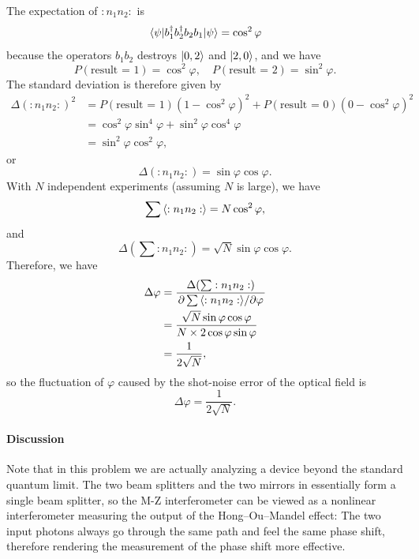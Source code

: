 \documentclass[hyperref, a4paper]{article}
\begin{document}
The expectation of $:n_1 n_2:$ is 
\begin{equation}
    \mel*{\psi}{b_1^\dagger b_2^\dagger b_2 b_1}{\psi} = \cos^2 \varphi 
\end{equation}
because the operators $b_1 b_2$ destroys $\ket{0, 2}$ and $\ket{2, 0}$, and we have 
\begin{equation}
    P(\text{result = $1$}) = \cos^2 \varphi, \quad P(\text{result = $2$}) = \sin^2 \varphi.
\end{equation}
The standard deviation is therefore given by
\[
    \begin{aligned}
        \Delta(: n_1 n_2 :)^2 &= P(\text{result = $1$}) (1 - \cos^2 \varphi)^2 + P(\text{result = $0$}) (0 - \cos^2 \varphi)^2 \\
        &= \cos^2 \varphi \sin^4 \varphi + \sin^2 \varphi \cos^4 \varphi \\
        &= \sin^2 \varphi \cos^2 \varphi,
    \end{aligned}
\]
or 
\begin{equation}
    \Delta(: n_1 n_2 :) = \sin \varphi \cos \varphi.
\end{equation}
With $N$ independent experiments (assuming $N$ is large), we have 
\[
    \sum \expval{: n_1 n_2 :} = N \cos^2 \varphi,
\]
and 
\[
    \Delta(\sum :n_1 n_2:) = \sqrt{N} \sin\varphi \cos \varphi.
\]
Therefore, we have 
\[
    \begin{aligned}
        \Delta\varphi &= \frac{\Delta(\sum :n_1 n_2:)}{\pdv*{\sum \expval{: n_1 n_2 :}}{\varphi}} \\
        &= \frac{\sqrt{N} \sin \varphi \cos \varphi}{N \times 2 \cos \varphi \sin \varphi} \\
        &= \frac{1}{2 \sqrt{N}},
    \end{aligned}
\]
so the fluctuation of $\varphi$ caused by the shot-noise error of the optical field is 
\begin{equation}
    \Delta\varphi = \frac{1}{2 \sqrt{N}}.
\end{equation}

\paragraph{Discussion} Note that in this problem we are actually analyzing a device beyond the standard quantum limit.
The two beam splitters and the two mirrors in  essentially form a single beam splitter, 
so the M-Z interferometer can be viewed as a nonlinear interferometer measuring the output of the Hong–Ou–Mandel effect:
The two input photons always go through the same path and feel the same phase shift, therefore rendering the measurement of 
the phase shift more effective.


 
\end{document}
